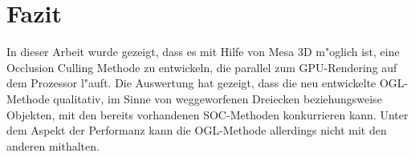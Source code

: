 \documentclass[journal]{vgtc}
\begin{document}
%
%
%
%

\section{Fazit}
In dieser Arbeit wurde gezeigt, dass es mit Hilfe von Mesa 3D m"oglich ist, eine Occlusion Culling Methode zu entwickeln, die parallel zum GPU-Rendering auf dem Prozessor l"auft.
Die Auswertung hat gezeigt, dass die neu entwickelte OGL-Methode qualitativ, im Sinne von weggeworfenen Dreiecken beziehungsweise Objekten, mit den bereits vorhandenen SOC-Methoden konkurrieren kann.
Unter dem Aspekt der Performanz kann die OGL-Methode allerdings nicht mit den anderen mithalten.  \\
\end{document}
